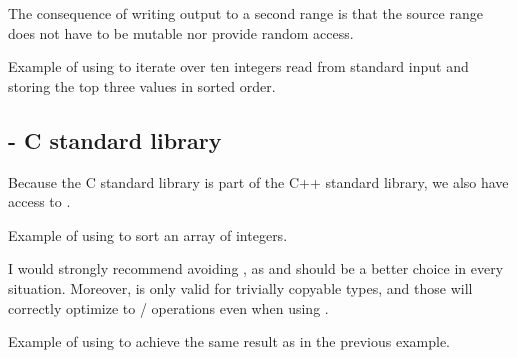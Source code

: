 The consequence of writing output to a second range is that the source range does not have to be mutable nor provide random access.

\begin{box-note}
\footnotesize Example of using  to iterate over ten integers read from standard input and storing the top three values in sorted order.
\tcblower
{}
\end{box-note}

\subsection{\texorpdfstring{}{\texttt{qsort}} - C standard library}

Because the C standard library is part of the C++ standard library, we also have access to .

\begin{box-note}
\footnotesize Example of using  to sort an array of integers.
\tcblower
{}
\end{box-note}

I would strongly recommend avoiding , as  and  should be a better choice in every situation. Moreover,  is only valid for trivially copyable types, and those will correctly optimize to / operations even when using .

\begin{box-note}
\footnotesize Example of using  to achieve the same result as in the previous example.
\tcblower
{}
\end{box-note}